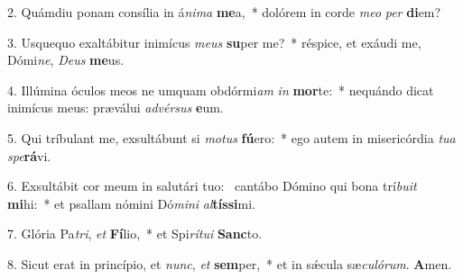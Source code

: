 2. Quámdiu ponam consília in á\textit{ni}\textit{ma} \textbf{me}a,~*  dolórem in corde \textit{me}\textit{o} \textit{per} \textbf{di}em?\

3. Usquequo exaltábitur inimícus \textit{me}\textit{us} \textbf{su}per me?~*  réspice, et exáudi me, Dómi\textit{ne}, \textit{De}\textit{us} \textbf{me}us.\

4. Illúmina óculos meos ne umquam obdórmi\textit{am} \textit{in} \textbf{mor}te:~*  nequándo dicat inimícus meus: præválui \textit{ad}\textit{vér}\textit{sus} \textbf{e}um.\

5. Qui tríbulant me, exsultábunt si \textit{mo}\textit{tus} \textbf{fú}ero:~*  ego autem in misericórdia \textit{tu}\textit{a} \textit{spe}\textbf{rá}vi.\

6. Exsultábit cor meum in salutári tuo: \dag\  cantábo Dómino qui bona trí\textit{bu}\textit{it} \textbf{mi}hi:~*  et psallam nómini Dó\textit{mi}\textit{ni} \textit{al}\textbf{tís}\textbf{si}mi.\

7. Glória Pa\textit{tri}, \textit{et} \textbf{Fí}lio,~*  et Spi\textit{rí}\textit{tu}\textit{i} \textbf{Sanc}to.\

8. Sicut erat in princípio, et \textit{nunc}, \textit{et} \textbf{sem}per,~*  et in sǽcula sæ\textit{cu}\textit{ló}\textit{rum}. \textbf{A}men.\

